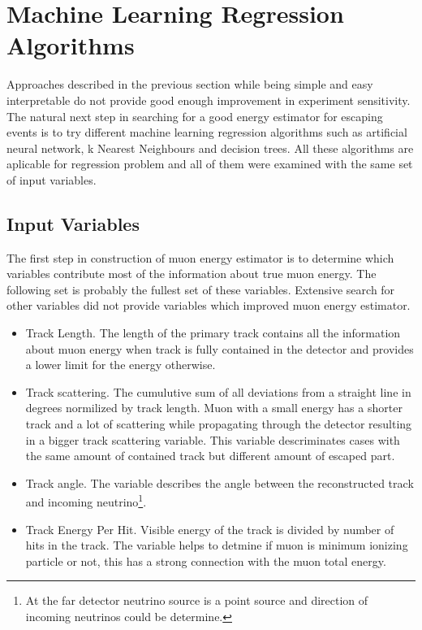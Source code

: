 \section{Machine Learning Regression Algorithms}
Approaches described in the previous section while being simple and easy interpretable do
not provide good enough improvement in experiment sensitivity. The natural next step in
searching for a good energy estimator for escaping events is to try different machine 
learning regression algorithms such as artificial neural network, k Nearest Neighbours and
decision trees. All these algorithms are aplicable for regression problem and all of them 
were examined with the same set of input variables.

\subsection{Input Variables}
The first step in construction of muon energy estimator is to determine which variables 
contribute most of the information about true muon energy. The following set is probably
the fullest set of these variables. Extensive search for other variables did not provide 
variables which improved muon energy estimator.
\begin{itemize}
\item Track Length. The length of the primary track contains all the information about muon
energy when track is fully contained in the detector and provides a lower limit for the 
energy otherwise.
\item Track scattering. The cumulutive sum of all deviations from a straight line in degrees
normilized by track length. Muon with a small energy has a shorter track and a lot of scattering 
while propagating through the detector resulting in a bigger track scattering variable. 
This variable descriminates cases with the same amount of contained track but different amount
of escaped part.
\item Track angle. The variable describes the angle between the reconstructed track and 
incoming neutrino\footnote{At the far detector neutrino source is a point source and direction
of incoming neutrinos could be determine.}. 
\item Track Energy Per Hit. Visible energy of the track is divided by number of hits in the 
track. The variable helps to detmine if muon is minimum ionizing particle or not, this has
a strong connection with the muon total energy.
\end{itemize}

